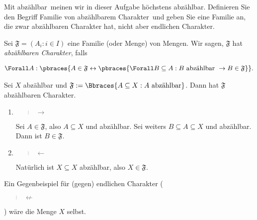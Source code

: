 
\begin{exercise}[278]

Mit \glqq abzählbar\grqq\  meinen wir in dieser Aufgabe \glqq höchstens abzählbar\grqq.
Definieren Sie den Begriff \glqq Familie von abzählbarem Charakter\grqq\ und geben
Sie eine Familie an, die zwar abzählbaren Charakter hat, nicht aber endlichen Charakter.

\end{exercise}


\begin{solution}

Sei $\mathfrak{F} = (A_i: i \in I)$ eine Familie (oder Menge) von Mengen.
Wir sagen, $\mathfrak{F}$ hat \textit{abzählbaren Charakter}, falls

\begin{align*}
  \Forall A:
  \pbraces
  {
    A \in \mathfrak{F}
    \leftrightarrow
    \pbraces
    {
      \Forall B \subseteq A:
      B ~\text{abzählbar}~
      \to
      B \in \mathfrak{F}
    }
  }.
\end{align*}


  Sei $X$ abzählbar und $\mathfrak{F} := \Bbraces{A \subseteq X: A ~\text{abzählbar}}$.
  Dann hat $\mathfrak{F}$ abzählbaren Charakter.

  \begin{enumerate}[label = \texttt{ad}]

    \item \blockquote{$\to$}:

    Sei $A \in \mathfrak{F}$, also $A \subseteq X$ und abzählbar.
    Sei weiters $B \subseteq A \subseteq X$ und abzählbar.
    Dann ist $B \in \mathfrak{F}$.

    \item \blockquote{$\leftarrow$}:

    Natürlich ist $X \subseteq X$ abzählbar, also $X \in \mathfrak{F}$.

  \end{enumerate}

  Ein Gegenbeispiel für (gegen) endlichen Charakter (\blockquote{$\not \leftarrow$}) wäre die Menge $X$ selbst.


\end{solution}

